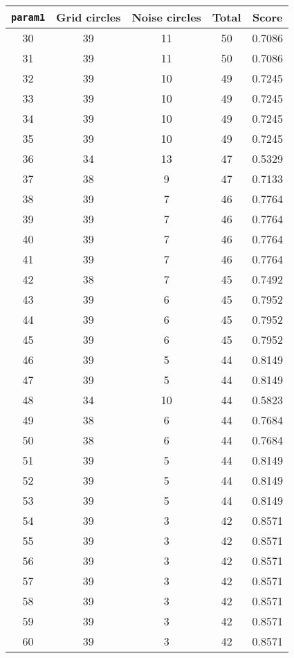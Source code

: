 \documentclass[letterpaper, 12pt]{article}
\begin{document}
\begin{longtable}{|c|c|c|c|c|}
\hline
\textbf{\texttt{param1}} & \textbf{Grid circles} & \textbf{Noise circles} & \textbf{Total} & \textbf{Score} \\
\hline
30 & 39 & 11 & 50 & 0.7086 \\
\hline
31 & 39 & 11 & 50 & 0.7086 \\
\hline
32 & 39 & 10 & 49 & 0.7245 \\
\hline
33 & 39 & 10 & 49 & 0.7245 \\
\hline
34 & 39 & 10 & 49 & 0.7245 \\
\hline
35 & 39 & 10 & 49 & 0.7245 \\
\hline
36 & 34 & 13 & 47 & 0.5329 \\
\hline
37 & 38 & 9 & 47 & 0.7133 \\
\hline
38 & 39 & 7 & 46 & 0.7764 \\
\hline
39 & 39 & 7 & 46 & 0.7764 \\
\hline
40 & 39 & 7 & 46 & 0.7764 \\
\hline
41 & 39 & 7 & 46 & 0.7764 \\
\hline
42 & 38 & 7 & 45 & 0.7492 \\
\hline
43 & 39 & 6 & 45 & 0.7952 \\
\hline
44 & 39 & 6 & 45 & 0.7952 \\
\hline
45 & 39 & 6 & 45 & 0.7952 \\
\hline
46 & 39 & 5 & 44 & 0.8149 \\
\hline
47 & 39 & 5 & 44 & 0.8149 \\
\hline
48 & 34 & 10 & 44 & 0.5823 \\
\hline
49 & 38 & 6 & 44 & 0.7684 \\
\hline
50 & 38 & 6 & 44 & 0.7684 \\
\hline
51 & 39 & 5 & 44 & 0.8149 \\
\hline
52 & 39 & 5 & 44 & 0.8149 \\
\hline
53 & 39 & 5 & 44 & 0.8149 \\
\hline
54 & 39 & 3 & 42 & 0.8571 \\
\hline
55 & 39 & 3 & 42 & 0.8571 \\
\hline
56 & 39 & 3 & 42 & 0.8571 \\
\hline
57 & 39 & 3 & 42 & 0.8571 \\
\hline
58 & 39 & 3 & 42 & 0.8571 \\
\hline
59 & 39 & 3 & 42 & 0.8571 \\
\hline
60 & 39 & 3 & 42 & 0.8571 \\
\hline

\end{longtable}
\end{document}
